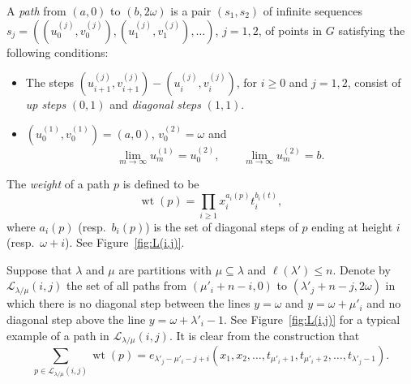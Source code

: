 \documentclass{amsart}
\numberwithin{equation}{section}
\theoremstyle{definition}
\newcommand\LL{\mathcal{L}_\lm}
\newcommand\lm{{\lambda/\mu}}
\newcommand\wt{\operatorname{wt}}
\begin{document}
A \emph{path} from $(a,0)$ to $(b,2\omega)$ is a pair $(s_1,s_2)$ of infinite
sequences $s_j=((u_{0}^{(j)},v_{0}^{(j)}), (u_{1}^{(j)},v_{1}^{(j)}),\dots)$,
$j=1,2$, of points in $G$ satisfying the following conditions:
\begin{itemize}
\item The steps $(u_{i+1}^{(j)},v_{i+1}^{(j)})- (u_{i}^{(j)},v_{i}^{(j)})$, for
  $i\ge0$ and $j=1,2$, consist of \emph{up steps} $(0,1)$ and \emph{diagonal
    steps} $(1,1)$.
\item $(u_0^{(1)},v_0^{(1)})=(a,0)$, $v_0^{(2)}=\omega$ and
  \[
    \lim_{m\to\infty} u_m^{(1)} = u_0^{(2)}, \qquad
    \lim_{m\to\infty} u_m^{(2)} = b.
  \]
\end{itemize}
The \emph{weight} of a path $p$ is defined to be
\[
\wt(p) = \prod_{i\ge 1}x_i^{a_i(p)} t_i^{b_i(t)},
\]
where $a_i(p)$ (resp.~$b_i(p)$) is the set of diagonal steps of $p$ ending at
height $i$ (resp.~$\omega+i$). See Figure~\ref{fig:L(i,j)}.

Suppose that $\lambda$ and $\mu$ are partitions with $\mu\subseteq\lambda$ and
$\ell(\lambda')\le n$. Denote by $\LL(i,j)$ the set of all paths from
$(\mu'_i+n-i,0)$ to $(\lambda'_j+n-j,2\omega)$ in which there is no diagonal
step between the lines $y=\omega$ and $y=\omega+\mu'_i$ and no diagonal step
above the line $y=\omega+\lambda'_i-1$. See Figure~\ref{fig:L(i,j)} for a
typical example of a path in $\LL(i,j)$. It is clear from the construction that
\begin{equation}
  \label{eq:e}
  \sum_{p\in \LL(i,j)} \wt(p)
  =e_{\lambda'_j-\mu'_i-j+i}(x_1,x_2,\dots,t_{\mu'_i+1},t_{\mu'_i+2},\dots, t_{\lambda'_j-1}).
\end{equation}
\end{document}
